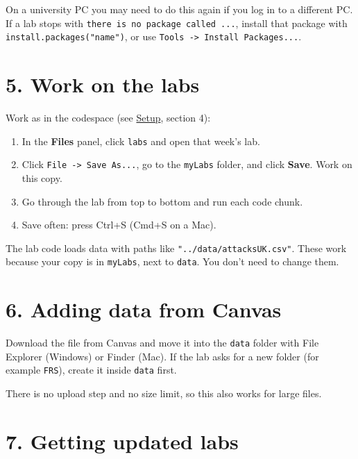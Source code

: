 \documentclass[
  letterpaper,
  DIV=11,
  numbers=noendperiod]{scrreprt}
\providecommand{\tightlist}{%
  \setlength{\itemsep}{0pt}\setlength{\parskip}{0pt}}
\begin{document}
On a university PC you may need to do this again if you log in to a
different PC. If a lab stops with
\texttt{there\ is\ no\ package\ called\ ...}, install that package with
\texttt{install.packages("name")}, or use
\texttt{Tools\ -\textgreater{}\ Install\ Packages...}.

\section*{5. Work on the labs}\label{work-on-the-labs}


Work as in the codespace (see
\hyperref[setup-rstudio-in-your-browser]{Setup}, section 4):

\begin{enumerate}
\def\labelenumi{\arabic{enumi}.}
\tightlist
\item
  In the \textbf{Files} panel, click \texttt{labs} and open that week's
  lab.
\item
  Click \texttt{File\ -\textgreater{}\ Save\ As...}, go to the
  \texttt{myLabs} folder, and click \textbf{Save}. Work on this copy.
\item
  Go through the lab from top to bottom and run each code chunk.
\item
  Save often: press Ctrl+S (Cmd+S on a Mac).
\end{enumerate}

The lab code loads data with paths like
\texttt{"../data/attacksUK.csv"}. These work because your copy is in
\texttt{myLabs}, next to \texttt{data}. You don't need to change them.

\section*{6. Adding data from Canvas}\label{adding-data-from-canvas-1}


Download the file from Canvas and move it into the \texttt{data} folder
with File Explorer (Windows) or Finder (Mac). If the lab asks for a new
folder (for example \texttt{FRS}), create it inside \texttt{data} first.

There is no upload step and no size limit, so this also works for large
files.

\section*{7. Getting updated labs}\label{getting-updated-labs}
\end{document}
